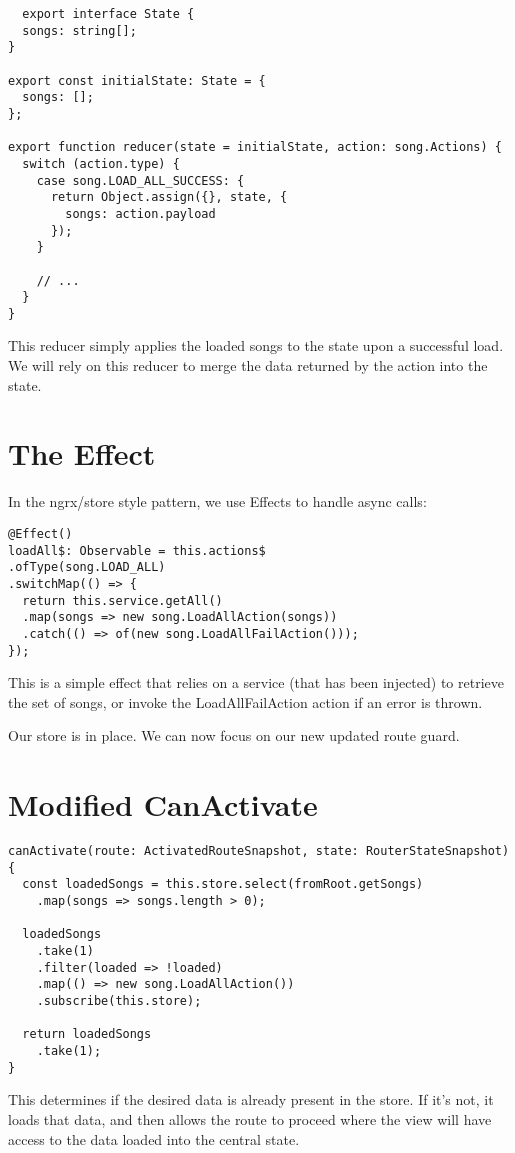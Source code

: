 \begin{lstlisting}
  export interface State {
  songs: string[];
}

export const initialState: State = {
  songs: [];
};

export function reducer(state = initialState, action: song.Actions) {
  switch (action.type) {
    case song.LOAD_ALL_SUCCESS: {
      return Object.assign({}, state, {
        songs: action.payload
      });
    }

    // ...
  }
}
\end{lstlisting}

This reducer simply applies the loaded songs to the state upon a successful
load.  We will rely on this reducer to merge the data returned by the action
into the state.

\section{The Effect}
In the ngrx/store style pattern, we use Effects to handle async calls:

\begin{lstlisting}
@Effect()
loadAll$: Observable = this.actions$
.ofType(song.LOAD_ALL)
.switchMap(() => {
  return this.service.getAll()
  .map(songs => new song.LoadAllAction(songs))
  .catch(() => of(new song.LoadAllFailAction()));
});
\end{lstlisting}

This is a simple effect that relies on a service (that has been injected) to
retrieve the set of songs, or invoke the LoadAllFailAction action if an error
is thrown.

Our store is in place. We can now focus on our new updated route guard.

\section{ Modified CanActivate }
\begin{lstlisting}
canActivate(route: ActivatedRouteSnapshot, state: RouterStateSnapshot) {
  const loadedSongs = this.store.select(fromRoot.getSongs)
    .map(songs => songs.length > 0);

  loadedSongs
    .take(1)
    .filter(loaded => !loaded)
    .map(() => new song.LoadAllAction())
    .subscribe(this.store);

  return loadedSongs
    .take(1);
}
\end{lstlisting}

This determines if the desired data is already present in the store. If it's
not, it loads that data, and then allows the route to proceed where the view
will have access to the data loaded into the central state.

